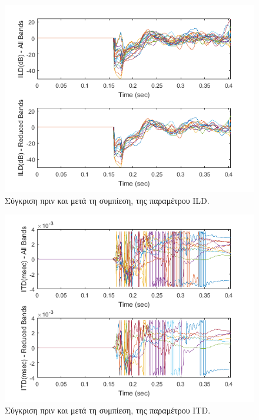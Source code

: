 \begin{figure}[h]
  \centering
  \includegraphics[width=\textwidth]{images/ILD_Perceptual_Comp.png}
  \caption{Σύγκριση πριν και μετά τη συμπίεση, της παραμέτρου ILD.}
  \label{fig:ILD_Perceptual_Comp}
\end{figure}

\begin{figure}[h]
  \centering
  \includegraphics[width=\textwidth]{images/ITD_Perceptual_Comp.png}
  \caption{Σύγκριση πριν και μετά τη συμπίεση, της παραμέτρου ITD.}
  \label{fig:ITD_Perceptual_Comp}
\end{figure}

\sectionbreak
